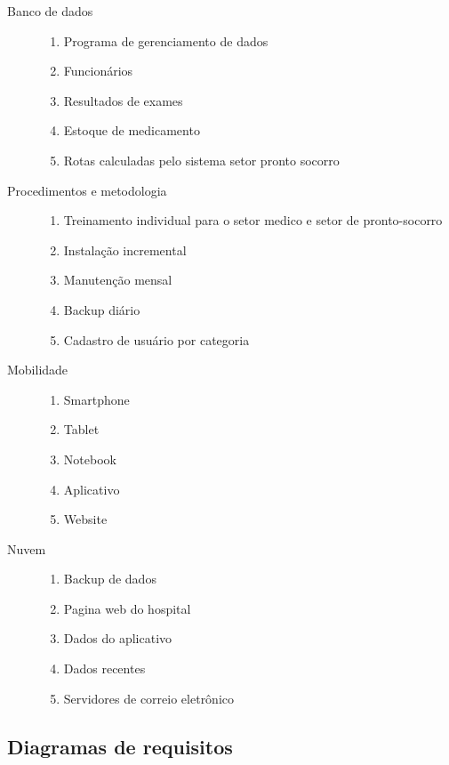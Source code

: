 \begin{description}
  \item[Banco de dados]
  \begin{enumerate}[resume]
    \item Programa de gerenciamento de dados
    \item Funcionários
    \item Resultados de exames
    \item Estoque de medicamento
    \item Rotas calculadas pelo sistema setor pronto socorro
  \end{enumerate}

  \item[Procedimentos e metodologia]
  \begin{enumerate}[resume]
    \item Treinamento individual para o setor medico e setor de pronto-socorro
    \item Instalação incremental
    \item Manutenção mensal
    \item Backup diário
    \item Cadastro de usuário por categoria
  \end{enumerate}

  \item[Mobilidade]
  \begin{enumerate}[resume]
    \item Smartphone
    \item Tablet
    \item Notebook
    \item Aplicativo
    \item Website
  \end{enumerate}

  \item[Nuvem]
  \begin{enumerate}[resume]
    \item Backup de dados
    \item Pagina web do hospital
    \item Dados do aplicativo
    \item Dados recentes
    \item Servidores de correio eletrônico
  \end{enumerate}
\end{description}
\subsection{Diagramas de requisitos}


